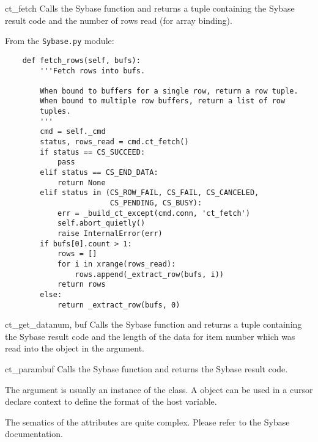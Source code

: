 \begin{methoddesc}[CS_COMMAND]{ct_fetch}{}
Calls the Sybase  function and returns a tuple
containing the Sybase result code and the number of rows read (for
array binding).

From the \texttt{Sybase.py} module:
\begin{verbatim}
    def fetch_rows(self, bufs):
        '''Fetch rows into bufs.

        When bound to buffers for a single row, return a row tuple.
        When bound to multiple row buffers, return a list of row
        tuples.
        '''
        cmd = self._cmd
        status, rows_read = cmd.ct_fetch()
        if status == CS_SUCCEED:
            pass
        elif status == CS_END_DATA:
            return None
        elif status in (CS_ROW_FAIL, CS_FAIL, CS_CANCELED,
                        CS_PENDING, CS_BUSY):
            err = _build_ct_except(cmd.conn, 'ct_fetch')
            self.abort_quietly()
            raise InternalError(err)
        if bufs[0].count > 1:
            rows = []
            for i in xrange(rows_read):
                rows.append(_extract_row(bufs, i))
            return rows
        else:
            return _extract_row(bufs, 0)
\end{verbatim}
\end{methoddesc}

\begin{methoddesc}[CS_COMMAND]{ct_get_data}{num, buf}
Calls the Sybase  function and returns a tuple
containing the Sybase result code and the length of the data for item
number  which was read into the  object in the
 argument.
\end{methoddesc}

\begin{methoddesc}[CS_COMMAND]{ct_param}{buf}
Calls the Sybase  function and returns the Sybase
result code.

The  argument is usually an instance of the 
class.  A  object can be used in a cursor declare
context to define the format of the host variable.

The sematics of the  attributes are quite complex.
Please refer to the Sybase documentation.
\end{methoddesc}

